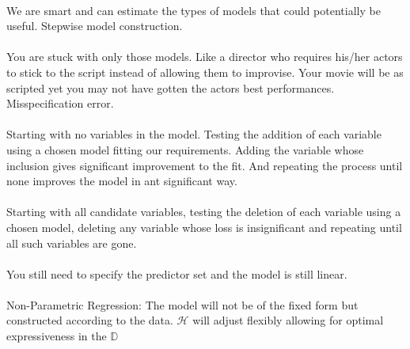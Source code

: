 \documentclass[12pt]{article}
\begin{document}


\begin{enumerate}

\\
We are smart and can estimate the types of models that could potentially be useful. Stepwise model construction.
\\
\\
You are stuck with only those models. Like a director who requires his/her actors to stick to the script instead of allowing them to improvise. Your movie will be as scripted yet you may not have gotten the actors best performances. Misspecification error.
\\


\\
Starting with no variables in the model. Testing the addition of each variable using a chosen model fitting our requirements. Adding the variable whose inclusion gives significant improvement to the fit. And repeating the process until none improves the model in ant significant way.
\\
\\
Starting with all candidate variables, testing the deletion of each variable using a chosen model, deleting any variable whose loss is insignificant and repeating until all such variables are gone.
\\

\\
You still need to specify the predictor set and the model is still linear.
\\
\\
Non-Parametric Regression: The model will not be of the fixed form but constructed according to the data. $\mathcal{H}$ will adjust flexibly allowing for optimal expressiveness in the $\mathbb{D}$
\\


\end{enumerate}
\end{document}
